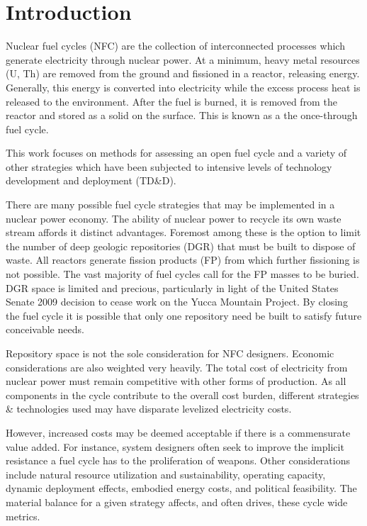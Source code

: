 \chapter{Introduction}
\label{diss_intro}

Nuclear fuel cycles (NFC) are the collection of interconnected processes which 
generate electricity through nuclear power.  
At a minimum, heavy metal resources (U, Th) are removed from the ground
and fissioned in a reactor, releasing energy.  Generally, this energy is converted 
into electricity while the excess process heat is released to the environment.  
After the fuel is burned, it is removed from the reactor and stored as a solid on the surface.
This is known as a the once-through fuel cycle.

This work focuses on methods for assessing an open fuel cycle and a variety of other 
strategies which have been subjected to intensive levels of technology development and 
deployment (TD\&D).

There are many possible fuel cycle strategies that may be implemented in a nuclear power economy.
The ability of nuclear power to recycle its own waste stream affords it distinct advantages.  
Foremost among these is the option to limit the number of deep geologic repositories (DGR) 
that must be built to dispose of waste.   All reactors generate fission products (FP) from 
which further fissioning is not possible.  The vast majority of fuel cycles call for the FP masses 
to be buried.  DGR space is limited and precious, particularly in light of the United States Senate 2009
decision to cease work on the Yucca Mountain Project.  
By closing the fuel cycle it is possible  that only one repository need be built to satisfy 
future conceivable needs.

Repository space is not the sole consideration for NFC designers.  Economic considerations 
are also weighted very heavily.  The total cost of electricity from nuclear power must remain competitive 
with other forms of production.  As all components in the cycle contribute to the overall cost burden, 
different strategies \& technologies used may have disparate levelized electricity costs.

However, increased costs may be deemed acceptable if there is a commensurate value added.
For instance, system designers often seek to improve the implicit resistance a fuel cycle 
has to the proliferation of weapons.  Other considerations include natural resource 
utilization and sustainability, operating capacity, dynamic deployment effects,
embodied energy costs, and political feasibility.  The material balance for a given strategy
affects, and often drives, these cycle wide metrics.

